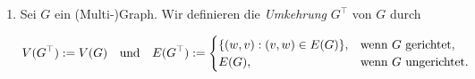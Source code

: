 \begin{definition}
\begin{enumerate}[
                label = \arabic*.,
                wide,
                labelindent = 0pt
            ]
                \item Sei $G$ ein (Multi-)Graph.
                Wir definieren die \textit{Umkehrung} $G^\top$ von $G$ durch
    
                \begin{align*}
                    V(G^\top) := V(G)
                    \quad
                    \text{und}
                    \quad
                    E(G^\top)
                    :=
                    \begin{cases}
                        {\left \{ (w, v): (v, w) \in E(G) \right \}},
                        & \text{wenn} ~ G ~ \text{gerichtet}, \\
                        E(G),
                        & \text{wenn} ~ G ~ \text{ungerichtet}.
                    \end{cases}
                \end{align*}

            \end{enumerate}    

        \end{definition}

